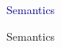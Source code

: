 \documentclass{beamer}
\begin{document}




\begin{frame}{}
\begin{center}
\textcolor{darkblue}{\huge Semantics}
\end{center}
\end{frame}

\begin{frame}{Semantics}

\end{frame}
\end{document}
